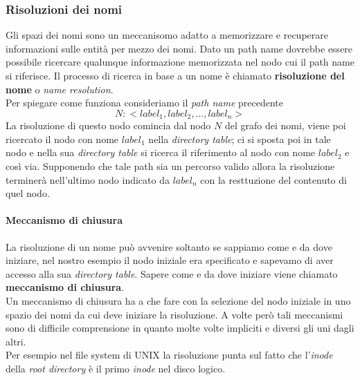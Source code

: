 \subsubsection{Risoluzioni dei nomi}
Gli spazi dei nomi sono un meccanisomo adatto a memorizzare e recuperare informazioni sulle entità per mezzo dei nomi. Dato un path name dovrebbe essere possibile ricercare qualunque informazione memorizzata nel nodo cui il path name si riferisce. Il processo di ricerca in base a un nome è chiamato \textbf{risoluzione del nome} o \emph{name resolution}.\\
Per spiegare come funziona consideriamo il \emph{path name} precedente
$$N:<label_1, label_2, \dots, label_n>$$
La risoluzione di questo nodo comincia dal nodo $N$ del grafo dei nomi, viene poi ricercato il nodo con nome $label_1$ nella \emph{directory table}; ci si sposta poi in tale nodo e nella sua \emph{directory table} si ricerca il riferimento al nodo con nome $label_2$ e così via. Supponendo che tale path sia un percorso valido allora la risoluzione terminerà nell'ultimo nodo indicato da $label_n$ con la resttuzione del contenuto di quel nodo.
\paragraph{Meccanismo di chiusura}
La risoluzione di un nome può avvenire soltanto se sappiamo come e da dove iniziare, nel nostro esempio il nodo iniziale era specificato e sapevamo di aver accesso alla sua \emph{directory table}. Sapere come e da dove iniziare viene chiamato \textbf{meccanismo di chiusura}.\\
Un meccanismo di chiusura ha a che fare con la selezione del nodo iniziale in uno spazio dei nomi da cui deve iniziare la risoluzione. A volte però tali meccanismi sono di difficile comprensione in quanto molte volte impliciti e diversi gli uni dagli altri.\\
Per esempio nel file system di UNIX la risoluzione punta sul fatto che l'\emph{inode} della \emph{root directory} è il primo \emph{inode} nel disco logico.
